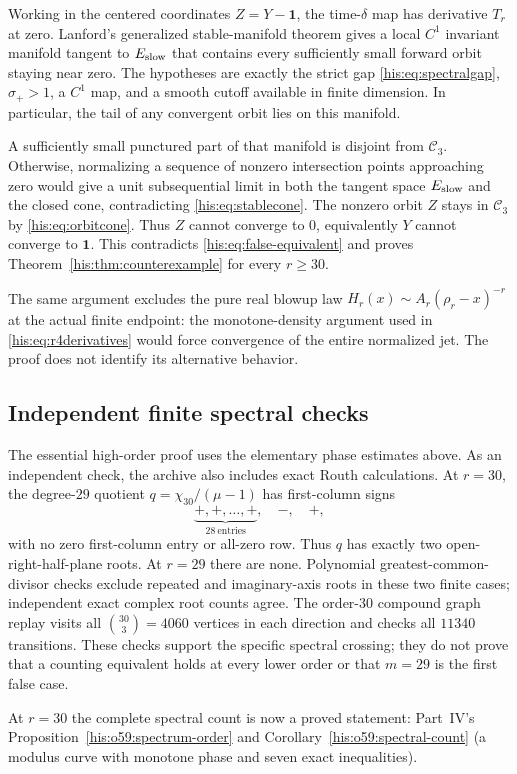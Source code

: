 Working in the centered coordinates $Z=Y-\mathbf1$, the time-$\delta$ map has derivative $T_r$ at zero. Lanford's generalized stable-manifold theorem \cite[Theorem~7.3.1(1),(3)]{lanford1997} gives a local $C^1$ invariant manifold tangent to $E_{\rm slow}$ that contains every sufficiently small forward orbit staying near zero. The hypotheses are exactly the strict gap \eqref{his:eq:spectralgap}, $\sigma_+>1$, a $C^1$ map, and a smooth cutoff available in finite dimension. In particular, the tail of any convergent orbit lies on this manifold.

A sufficiently small punctured part of that manifold is disjoint from $\mathcal C_3$. Otherwise, normalizing a sequence of nonzero intersection points approaching zero would give a unit subsequential limit in both the tangent space $E_{\rm slow}$ and the closed cone, contradicting \eqref{his:eq:stablecone}. The nonzero orbit $Z$ stays in $\mathcal C_3$ by \eqref{his:eq:orbitcone}. Thus $Z$ cannot converge to $0$, equivalently $Y$ cannot converge to $\mathbf1$. This contradicts \eqref{his:eq:false-equivalent} and proves Theorem~\ref{his:thm:counterexample} for every $r\ge30$.

The same argument excludes the pure real blowup law $H_r(x)\sim A_r(\rho_r-x)^{-r}$ at the actual finite endpoint: the monotone-density argument used in \eqref{his:eq:r4derivatives} would force convergence of the entire normalized jet. The proof does not identify its alternative behavior.

\subsection{Independent finite spectral checks}
The essential high-order proof uses the elementary phase estimates above. As an independent check, the archive also includes exact Routh calculations. At $r=30$, the degree-$29$ quotient $q=\chi_{30}/(\mu-1)$ has first-column signs
\[
 \underbrace{+,+,\ldots,+}_{28\ \mathrm{entries}},\quad-,\quad+,
\]
with no zero first-column entry or all-zero row. Thus $q$ has exactly two open-right-half-plane roots. At $r=29$ there are none. Polynomial greatest-common-divisor checks exclude repeated and imaginary-axis roots in these two finite cases; independent exact complex root counts agree. The order-$30$ compound graph replay visits all $\binom{30}{3}=4060$ vertices in each direction and checks all $11340$ transitions. These checks support the specific spectral crossing; they do not prove that a counting equivalent holds at every lower order or that $m=29$ is the first false case.
\begin{writenote}
At $r=30$ the complete spectral count is now a proved statement: Part~IV's Proposition~\ref{his:o59:spectrum-order} and Corollary~\ref{his:o59:spectral-count} (a modulus curve with monotone phase and seven exact inequalities).
\end{writenote}


